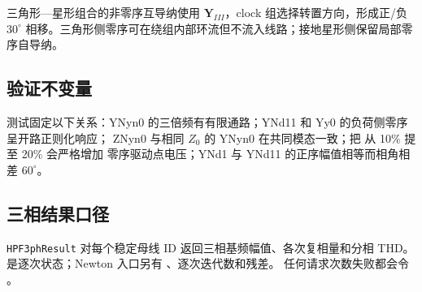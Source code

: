 三角形—星形组合的非零序互导纳使用 $\mathbf Y_{III}$，clock 组选择转置方向，形成正/负 $30^\circ$
相移。三角形侧零序可在绕组内部环流但不流入线路；接地星形侧保留局部零序自导纳。

\subsection{验证不变量}
测试固定以下关系：YNyn0 的三倍频有有限通路；YNd11 和 Yy0 的负荷侧零序呈开路正则化响应；
ZNyn0 与相同 $Z_0$ 的 YNyn0 在共同模态一致；把  从 10\% 提至 20\% 会严格增加
零序驱动点电压；YNd1 与 YNd11 的正序幅值相等而相角相差 $60^\circ$。

\subsection{三相结果口径}
\texttt{HPF3phResult} 对每个稳定母线 ID 返回三相基频幅值、各次复相量和分相 THD。
 是逐次状态；Newton 入口另有 、逐次迭代数和残差。
任何请求次数失败都会令 。
